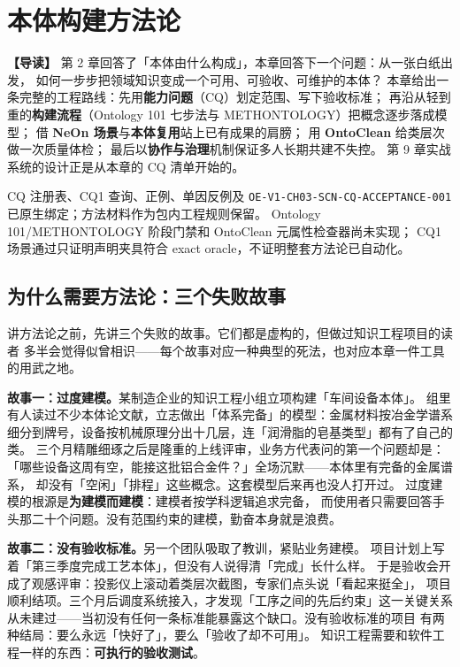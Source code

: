\chapter{本体构建方法论}

\begin{introbox}
\textbf{【导读】}
第 2 章回答了「本体由什么构成」，本章回答下一个问题：从一张白纸出发，
如何一步步把领域知识变成一个可用、可验收、可维护的本体？
本章给出一条完整的工程路线：先用\textbf{能力问题}（CQ）划定范围、写下验收标准；
再沿从轻到重的\textbf{构建流程}（Ontology 101 七步法与 METHONTOLOGY）把概念逐步落成模型；
借 \textbf{NeOn 场景}与\textbf{本体复用}站上已有成果的肩膀；
用 \textbf{OntoClean} 给类层次做一次质量体检；
最后以\textbf{协作与治理}机制保证多人长期共建不失控。
第 9 章实战系统的设计正是从本章的 CQ 清单开始的。
\end{introbox}

{CQ 注册表、CQ1 查询、正例、单因反例及
\texttt{OE-V1-CH03-SCN-CQ-ACCEPTANCE-001} 已原生绑定；方法材料作为包内工程规则保留。}
{Ontology 101/METHONTOLOGY 阶段门禁和 OntoClean 元属性检查器尚未实现；
CQ1 场景通过只证明声明夹具符合 exact oracle，不证明整套方法论已自动化。}

\section{为什么需要方法论：三个失败故事}

讲方法论之前，先讲三个失败的故事。它们都是虚构的，但做过知识工程项目的读者
多半会觉得似曾相识——每个故事对应一种典型的死法，也对应本章一件工具的用武之地。

\textbf{故事一：过度建模。}某制造企业的知识工程小组立项构建「车间设备本体」。
组里有人读过不少本体论文献，立志做出「体系完备」的模型：金属材料按冶金学谱系
细分到牌号，设备按机械原理分出十几层，连「润滑脂的皂基类型」都有了自己的类。
三个月精雕细琢之后是隆重的上线评审，业务方代表问的第一个问题却是：
「哪些设备这周有空，能接这批铝合金件？」全场沉默——本体里有完备的金属谱系，
却没有「空闲」「排程」这些概念。这套模型后来再也没人打开过。
过度建模的根源是\textbf{为建模而建模}：建模者按学科逻辑追求完备，
而使用者只需要回答手头那二十个问题。没有范围约束的建模，勤奋本身就是浪费。

\textbf{故事二：没有验收标准。}另一个团队吸取了教训，紧贴业务建模。
项目计划上写着「第三季度完成工艺本体」，但没有人说得清「完成」长什么样。
于是验收会开成了观感评审：投影仪上滚动着类层次截图，专家们点头说「看起来挺全」，
项目顺利结项。三个月后调度系统接入，才发现「工序之间的先后约束」这一关键关系
从未建过——当初没有任何一条标准能暴露这个缺口。没有验收标准的项目
有两种结局：要么永远「快好了」，要么「验收了却不可用」。
知识工程需要和软件工程一样的东西：\textbf{可执行的验收测试}。


